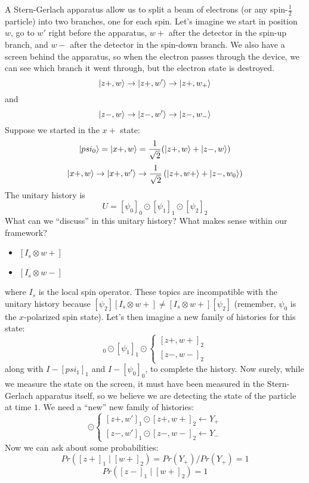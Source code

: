 \documentclass[a4paper,twoside,master.tex]{subfiles}
\begin{document}
A Stern-Gerlach apparatus allow us to split a beam of electrons (or any spin-$ \frac{1}{2}$ particle) into two branches, one for each spin. Let's imagine we start in position $w$, go to $w'$ right before the apparatus, $w+$ after the detector in the spin-up branch, and $w-$ after the detector in the spin-down branch. We also have a screen behind the apparatus, so when the electron passes through the device, we can see which branch it went through, but the electron state is destroyed.
\begin{equation}
    \ket{z+,w}\to\ket{z+,w'}\to\ket{z+,w_+}
\end{equation}
and
\begin{equation}
    \ket{z-,w}\to\ket{z-,w'}\to\ket{z-,w_-}
\end{equation}
Suppose we started in the $x+$ state:
\begin{equation}
    \ket{psi_0} = \ket{x+,w}=\frac{1}{\sqrt{2}}(\ket{z+,w}+\ket{z-,w})
\end{equation}
\begin{equation}
    \ket{x+,w}\to\ket{x+,w'}\to \frac{1}{\sqrt{2}}\left( \ket{z+,w+} + \ket{z-,w_0} \right) 
\end{equation}
The unitary history is
\begin{equation}
    U = [\psi_0]_0\odot[\psi_1]_1\odot[\psi_2]_2
\end{equation}
What can we ``discuss'' in this unitary history? What makes sense within our framework?
\begin{itemize}
    \item $[I_s\otimes w+]$
    \item $[I_s\otimes w-]$
\end{itemize}
where $I_s$ is the local spin operator. These topics are incompatible with the unitary history because $[\psi_2][I_s\otimes w+]\neq [I_s\otimes w+][\psi_2]$ (remember, $\psi_0$ is the $x$-polarized spin state).
Let's then imagine a new family of histories for this state:
\begin{equation}
    [\psi_0]_0\odot[\psi_1]_1\odot\begin{cases}
        [z+,w+]_2 \\ [z-,w-]_2
    \end{cases}
\end{equation}
along with $I-[psi_1]_1$ and $I-[\psi_0]_0$, to complete the history.
Now surely, while we measure the state on the screen, it must have been measured in the Stern-Gerlach apparatus itself, so we believe we are detecting the state of the particle at time $1$. We need a ``new'' new family of histories:
\begin{equation}
    [\psi_0]\odot\begin{cases}
        [z+,w']_1\odot[z+,w+]_2\leftarrow Y_+ \\ [z-,w']_1\odot[z-,w-]_2\leftarrow Y_-
    \end{cases}
\end{equation}
Now we can ask about some probabilities:
\begin{equation}
    Pr([z+]_1\mid[w+]_2) = Pr(Y_+) / Pr(Y_+) = 1
\end{equation}
\begin{equation}
    Pr([z-]_1\mid[w+]_2) = 1
\end{equation}
\end{document}
